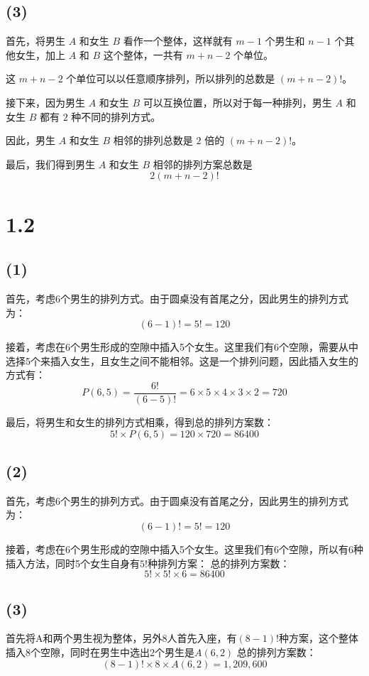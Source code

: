 \documentclass{article}
\begin{document}
\begin{CJK}{UTF8}{gbsn}
\subsection*{(3)} 
首先，将男生 $A$ 和女生 $B$ 看作一个整体，这样就有 $m-1$ 个男生和 $n-1$ 个其他女生，加上 $A$ 和 $B$ 这个整体，一共有 $m+n-2$ 个单位。

这 $m+n-2$ 个单位可以以任意顺序排列，所以排列的总数是 $(m+n-2)!$。

接下来，因为男生 $A$ 和女生 $B$ 可以互换位置，所以对于每一种排列，男生 $A$ 和女生 $B$ 都有 $2$ 种不同的排列方式。

因此，男生 $A$ 和女生 $B$ 相邻的排列总数是 $2$ 倍的 $(m+n-2)!$。

最后，我们得到男生 $A$ 和女生 $B$ 相邻的排列方案总数是 
\[
2(m+n-2)!
\]

\section*{1.2}
\subsection*{(1)} 

首先，考虑6个男生的排列方式。由于圆桌没有首尾之分，因此男生的排列方式为：
\[
(6-1)! = 5! = 120
\]

接着，考虑在6个男生形成的空隙中插入5个女生。这里我们有6个空隙，需要从中选择5个来插入女生，且女生之间不能相邻。这是一个排列问题，因此插入女生的方式有：
\[
P(6, 5) = \frac{6!}{(6-5)!} = 6 \times 5 \times 4 \times 3 \times 2 = 720
\]

最后，将男生和女生的排列方式相乘，得到总的排列方案数：
\[
5! \times P(6, 5) = 120 \times 720 = 86400
\]

\subsection*{(2)} 
首先，考虑6个男生的排列方式。由于圆桌没有首尾之分，因此男生的排列方式为：
\[
(6-1)! = 5! = 120
\]

接着，考虑在6个男生形成的空隙中插入5个女生。这里我们有6个空隙，所以有6种插入方法，同时5个女生自身有$5!$种排列方案：
总的排列方案数：
\[
5! \times 5!  \times 6 = 86400
\]
\subsection*{(3)} 
首先将A和两个男生视为整体，另外8人首先入座，有$(8-1)!$种方案，这个整体插入8个空隙，同时在男生中选出2个男生是$A(6,2)$
总的排列方案数：
\[
(8-1)! \times 8  \times A(6,2) =1,209,600
\]

\end{CJK}
\end{document}
